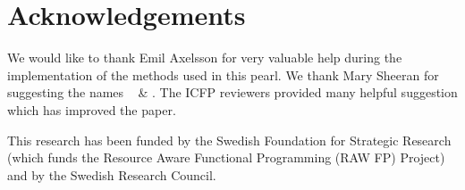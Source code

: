 %


%
%



\section*{Acknowledgements} 
We would like to thank Emil Axelsson for very valuable help 
during the implementation of the methods used in this pearl. We 
thank Mary Sheeran for suggesting the names \docname~ \& \studname. 
The ICFP reviewers provided many helpful suggestion which has improved the 
paper.

This research has been funded by the Swedish Foundation for
Strategic Research (which funds the Resource Aware Functional 
Programming (RAW FP) Project) and by the Swedish Research Council.

